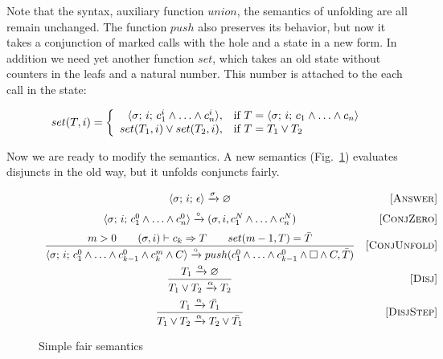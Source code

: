 Note that the syntax, auxiliary function $union$, the semantics of unfolding are all remain unchanged. The function $push$ also preserves its behavior, but now it takes a conjunction of marked
calls with the hole and a state in a new form. In addition we need yet another function $set$, which takes an old state without counters in the leafs and a natural number. This number is
attached to the each call in the state:

\[
set(T, i) =
\left\{
\begin{array}{rl}
\langle \sigma;\, i;\, c_1^i \land \ldots \land c_n^i \rangle, & \mbox{if } T = \langle \sigma;\, i;\, c_1 \land \ldots \land c_n \rangle \\
set(T_1, i) \lor set(T_2, i), & \mbox{if } T = T_1 \lor T_2
\end{array}
\right.
\]

Now we are ready to modify the semantics. A new semantics (Fig.~\ref{fair:naive-semantics}) evaluates disjuncts in the old way,
but it unfolds conjuncts fairly.

\begin{figure}[h!]
\[\begin{array}{cr}

      {\langle \sigma;\, i;\, \epsilon \rangle \xrightarrow{\sigma} \varnothing}  
&     \mbox{[\textsc{Answer}]} \\[2mm]
      {\langle \sigma;\, i;\, c_1^0 \land \ldots \land c_n^0 \rangle \xrightarrow{\circ} (\sigma, i, c_1^N \land \ldots \land c_n^N)}
&     \mbox{[\textsc{ConjZero}]} \\[2mm]
\dfrac{m > 0 \qquad (\sigma, i) \vdash c_k \Rightarrow T \qquad set(m - 1, T) = \bar{T}}
      {\langle \sigma;\, i;\, c_1^0 \land \ldots \land c_{k-1}^0 \land c_k^m \land C \rangle \xrightarrow{\circ} push(c_1^0 \land \ldots \land c_{k-1}^0 \land \Box \land C, \bar{T})}
&     \mbox{[\textsc{ConjUnfold}]} \\[4mm]
\dfrac{T_1 \xrightarrow{\alpha} \varnothing}
      {T_1 \lor T_2 \xrightarrow{\alpha} T_2}
&     \mbox{[\textsc{Disj}]} \\[4mm]
\dfrac{T_1 \xrightarrow{\alpha} \bar{T_1}}
      {T_1 \lor T_2 \xrightarrow{\alpha} T_2 \lor\bar{T_1}}
&     \mbox{[\textsc{DisjStep}]}
\end{array}\]
\caption{Simple fair semantics}
\label{fair:naive-semantics}
\end{figure}

